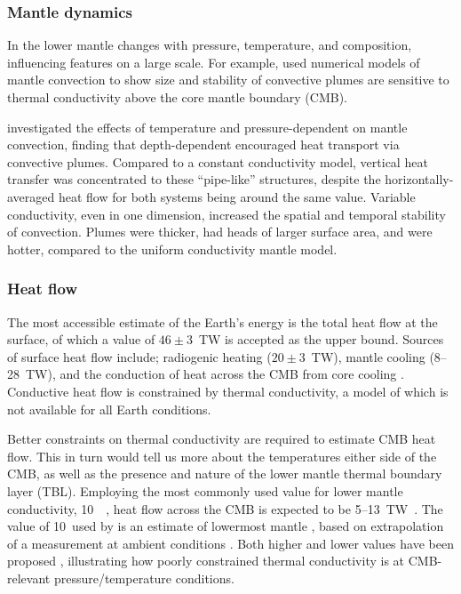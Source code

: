 \subsubsection{Mantle dynamics}

In the lower mantle \tcs changes with pressure, temperature, and composition, influencing features on a large scale. For example, \citet{Naliboff2006} used numerical models of mantle convection to show size and stability of convective plumes are sensitive to thermal conductivity above the core mantle boundary (CMB).

\citet{Dubuffet2000} investigated the effects of temperature and pressure-dependent \tcs on mantle convection, finding that depth-dependent \tcs encouraged heat transport via convective plumes. Compared to a constant conductivity model, vertical heat transfer was concentrated to these ``pipe-like'' structures, despite the horizontally-averaged heat flow for both systems being around the same value. Variable conductivity, even in one dimension, increased the spatial and temporal stability of convection. Plumes were thicker, had heads of larger surface area, and were hotter, compared to the uniform conductivity mantle model.

\subsubsection{Heat flow}

The most accessible estimate of the Earth's energy is the total heat flow at the surface, of which a value of $46\pm3$~TW is accepted as the upper bound. Sources of surface heat flow include; radiogenic heating ($20\pm3$~TW), mantle cooling (8--28~TW), and the conduction of heat across the CMB from core cooling \citep{Lay2008}. Conductive heat flow is constrained by thermal conductivity, a model of which is not available for all Earth conditions.

Better constraints on thermal conductivity are required to estimate CMB heat flow. This in turn would tell us more about the temperatures either side of the CMB, as well as the presence and nature of the lower mantle thermal boundary layer (TBL). Employing the most commonly used value for lower mantle conductivity, 10~\wmk~\citep{Lay2008}, heat flow across the CMB is expected to be 5--13~TW~\citep{Lay2008}. The value of 10~\wmks used by \citet{Lay2006} is an estimate of lowermost mantle \tc, based on extrapolation of a measurement at ambient conditions \citep{Osako1991}. Both higher and lower values have been proposed \citep[4--16~\wmk,][]{Manthilake2011}, illustrating how poorly constrained thermal conductivity is at CMB-relevant pressure/temperature conditions.

